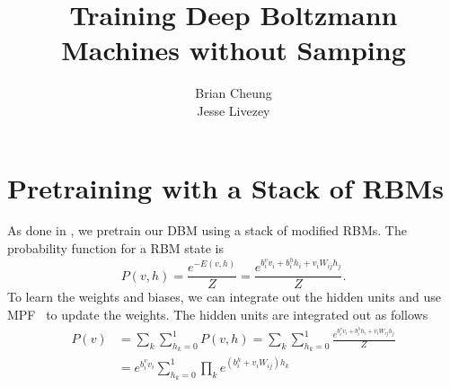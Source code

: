 \documentclass[11pt]{article}
\title{Training Deep Boltzmann Machines without Samping}
\author{Brian Cheung\\
Jesse Livezey}
\begin{document}
\maketitle

\section{Pretraining with a Stack of RBMs}
As done in \cite{Salakhutdinov2009}, we pretrain our DBM using a stack of modified RBMs.
The probability function for a RBM state is
\begin{equation}
  \label{eq:Prbm}
  P(v,h)=\frac{e^{-E(v,h)}}{Z}=\frac{e^{b_i^vv_i+b_i^hh_i+v_iW_{ij}h_j}}{Z}.
\end{equation}
To learn the weights and biases, we can integrate out the hidden units and use MPF~\cite{Sohl-Dickstein2011} to update the weights.
The hidden units are integrated out as follows
\begin{equation}
  \label{eq:intouth}
  \begin{split}
    P(v)&=\sum_k\sum_{h_k=0}^1P(v,h)=\sum_k\sum_{h_k=0}^1\frac{e^{b_i^vv_i+b_i^hh_i+v_iW_{ij}h_j}}{Z}\\
        &=e^{b_i^vv_i}\sum_{h_k=0}^1\prod_ke^{(b_i^h+v_iW_{ij})h_k}
  \end{split}
\end{equation}
\end{document}

